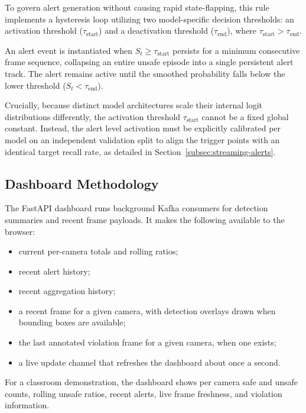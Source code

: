 \documentclass[conference]{IEEEtran}
\begin{document}
To govern alert generation without causing rapid state-flapping, this rule implements a hysteresis loop utilizing two model-specific decision thresholds: an activation threshold ($\tau_{\text{start}}$) and a deactivation threshold ($\tau_{\text{end}}$), where $\tau_{\text{start}} > \tau_{\text{end}}$. 

An alert event is instantiated when $S_t \ge \tau_{\text{start}}$ persists for a minimum consecutive frame sequence, collapsing an entire unsafe episode into a single persistent alert track. The alert remains active until the smoothed probability falls below the lower threshold ($S_t < \tau_{\text{end}}$). 

Crucially, because distinct model architectures scale their internal logit distributions differently, the activation threshold $\tau_{\text{start}}$ cannot be a fixed global constant. Instead, the alert level activation must be explicitly calibrated per model on an independent validation split to align the trigger points with an identical target recall rate, as detailed in Section~\ref{subsec:streaming-alerts}.

\subsection{Dashboard Methodology}

The FastAPI dashboard runs background Kafka consumers for detection
summaries and recent frame payloads. It makes the following available to the
browser:

\begin{itemize}
    \item current per-camera totals and rolling ratios;

    \item recent alert history;

    \item recent aggregation history;

    \item a recent frame for a given camera, with detection overlays drawn when
    bounding boxes are available;

    \item the last annotated violation frame for a given camera, when one exists;

    \item a live update channel that refreshes the dashboard about once a second.
\end{itemize}

For a classroom demonstration, the dashboard shows per camera safe and
unsafe counts, rolling unsafe ratios, recent alerts, live frame freshness,
and violation information.
\end{document}
